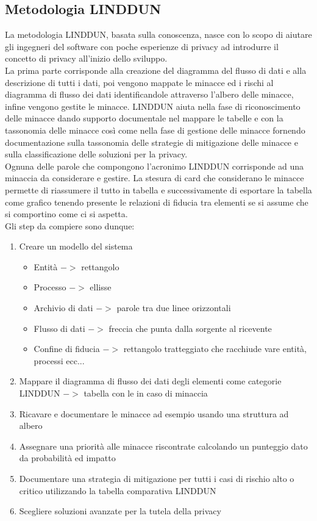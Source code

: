 \subsection{Metodologia LINDDUN}
La metodologia \acrfull{LINDDUN}, basata sulla conoscenza, nasce con lo scopo di aiutare gli ingegneri del software con poche esperienze di privacy ad introdurre il concetto di privacy all'inizio dello sviluppo.\\
La prima parte corrisponde alla creazione del diagramma del flusso di dati e alla descrizione di tutti i dati, poi vengono mappate le minacce ed i rischi al diagramma di flusso dei dati identificandole attraverso l'albero delle minacce, infine vengono gestite le minacce.
\acrshort{LINDDUN} aiuta nella fase di riconoscimento delle minacce dando supporto documentale nel mappare le tabelle e con la tassonomia delle minacce così come nella fase di gestione delle minacce fornendo documentazione sulla tassonomia delle strategie di mitigazione delle minacce e sulla classificazione delle soluzioni per la privacy.\\
Ognuna delle parole che compongono l'acronimo \acrshort{LINDDUN} corrisponde ad una minaccia da considerare e gestire.
La stesura di card che considerano le minacce permette di riassumere il tutto in tabella e successivamente di esportare la tabella come grafico tenendo presente le relazioni di fiducia tra elementi se si assume che si comportino come ci si aspetta.\\
Gli step da compiere sono dunque:
\begin{enumerate}[noitemsep]
    \item Creare un modello del sistema
    \begin{itemize}[noitemsep]
        \item Entità $->$ rettangolo
        \item Processo $->$ ellisse
        \item Archivio di dati $->$ parole tra due linee orizzontali
        \item Flusso di dati $->$ freccia che punta dalla sorgente al ricevente
        \item Confine di fiducia $->$ rettangolo tratteggiato che racchiude vare entità, processi ecc...
    \end{itemize}
    \item Mappare il diagramma di flusso dei dati degli elementi come categorie \acrshort{LINDDUN} $->$ tabella con le  in caso di minaccia
    \item Ricavare e documentare le minacce ad esempio usando una struttura ad albero
    \item Assegnare una priorità alle minacce riscontrate calcolando un punteggio dato da probabilità ed impatto
    \item Documentare una strategia di mitigazione per tutti i casi di rischio alto o critico utilizzando la tabella comparativa \acrshort{LINDDUN}
    \item Scegliere soluzioni avanzate per la tutela della privacy
\end{enumerate}
